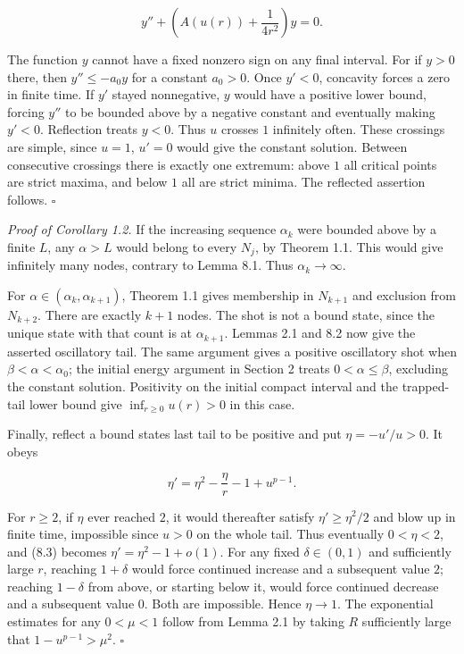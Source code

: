 \documentclass[11pt]{article}
\begin{document}
\[y''+\left(A(u(r))+\frac1{4r^2}\right)y=0. \tag{8.2}\]

The function \(y\) cannot have a fixed nonzero sign on any final
interval. For if \(y>0\) there, then \(y''\leq-a_0y\) for a constant
\(a_0>0\). Once \(y'<0\), concavity forces a zero in finite time. If
\(y'\) stayed nonnegative, \(y\) would have a positive lower bound,
forcing \(y''\) to be bounded above by a negative constant and
eventually making \(y'<0\). Reflection treats \(y<0\). Thus \(u\)
crosses \(1\) infinitely often. These crossings are simple, since
\(u=1\), \(u'=0\) would give the constant solution. Between consecutive
crossings there is exactly one extremum: above \(1\) all critical points
are strict maxima, and below \(1\) all are strict minima. The reflected
assertion follows. \(\square\)

\emph{Proof of Corollary 1.2.} If the increasing sequence \(\alpha_k\)
were bounded above by a finite \(L\), any \(\alpha>L\) would belong to
every \(N_j\), by Theorem 1.1. This would give infinitely many nodes,
contrary to Lemma 8.1. Thus \(\alpha_k\to\infty\).

For \(\alpha\in(\alpha_k,\alpha_{k+1})\), Theorem 1.1 gives membership
in \(N_{k+1}\) and exclusion from \(N_{k+2}\). There are exactly \(k+1\)
nodes. The shot is not a bound state, since the unique state with that
count is at \(\alpha_{k+1}\). Lemmas 2.1 and 8.2 now give the asserted
oscillatory tail. The same argument gives a positive oscillatory shot
when \(\beta<\alpha<\alpha_0\); the initial energy argument in Section 2
treats \(0<\alpha\leq\beta\), excluding the constant solution.
Positivity on the initial compact interval and the trapped-tail lower
bound give \(\inf_{r\geq0}u(r)>0\) in this case.

Finally, reflect a bound state\textquotesingle s last tail to be
positive and put \(\eta=-u'/u>0\). It obeys

\[\eta'=\eta^2-\frac\eta r-1+u^{p-1}. \tag{8.3}\]

For \(r\geq2\), if \(\eta\) ever reached \(2\), it would thereafter
satisfy \(\eta'\geq\eta^2/2\) and blow up in finite time, impossible
since \(u>0\) on the whole tail. Thus eventually \(0<\eta<2\), and (8.3)
becomes \(\eta'=\eta^2-1+o(1)\). For any fixed \(\delta\in(0,1)\) and
sufficiently large \(r\), reaching \(1+\delta\) would force continued
increase and a subsequent value \(2\); reaching \(1-\delta\) from above,
or starting below it, would force continued decrease and a subsequent
value \(0\). Both are impossible. Hence \(\eta\to1\). The exponential
estimates for any \(0<\mu<1\) follow from Lemma 2.1 by taking \(R\)
sufficiently large that \(1-u^{p-1}>\mu^2\). \(\square\)
\end{document}
